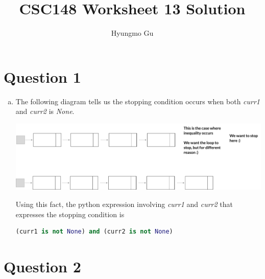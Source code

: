 \documentclass[12pt]{article}
\begin{document}
\title{CSC148 Worksheet 13 Solution}
\author{Hyungmo Gu}
\maketitle

\section*{Question 1}
\begin{enumerate}[a.]
    \item

    The following diagram tells us the stopping condition occurs when both
    \textit{curr1} and \textit{curr2} is \textit{None}.

    \begin{center}
    \includegraphics[width=\linewidth]{images/worksheet_13_q1a_solution.png}
    \end{center}

    \bigskip

    Using this fact, the python expression involving \textit{curr1}
    and \textit{curr2} that expresses the stopping condition is

    \bigskip

    \begin{lstlisting}[language=Python]
    (curr1 is not None) and (curr2 is not None)
    \end{lstlisting}

\end{enumerate}

\section*{Question 2}
\end{document}
